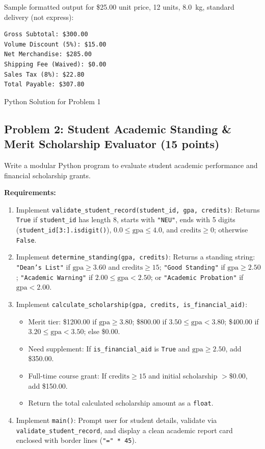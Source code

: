 \documentclass[11pt,a4paper]{article}
\begin{document}
Sample formatted output for \$25.00 unit price, 12 units, 8.0~kg, standard delivery (not express):
\begin{lstlisting}
Gross Subtotal: $300.00
Volume Discount (5%): $15.00
Net Merchandise: $285.00
Shipping Fee (Waived): $0.00
Sales Tax (8%): $22.80
Total Payable: $307.80
\end{lstlisting}

\begin{answerbox}[height=7.8cm]{Python Solution for Problem 1}
\end{answerbox}

\newpage


\subsection*{Problem 2: Student Academic Standing \& Merit Scholarship Evaluator (15 points)}
Write a modular Python program to evaluate student academic performance and financial scholarship grants.

\textbf{Requirements:}
\begin{enumerate}[leftmargin=1.8em,label=\arabic*.,itemsep=1.5pt]
  \item Implement \texttt{validate\_student\_record(student\_id, gpa, credits)}: Returns \texttt{True} if \texttt{student\_id} has length 8, starts with \texttt{"NEU"}, ends with 5 digits (\texttt{student\_id[3:].isdigit()}), $0.0 \le \text{gpa} \le 4.0$, and $\text{credits} \ge 0$; otherwise \texttt{False}.
  \item Implement \texttt{determine\_standing(gpa, credits)}: Returns a standing string:
    \texttt{"Dean's List"} if $\text{gpa} \ge 3.60$ and $\text{credits} \ge 15$;
    \texttt{"Good Standing"} if $\text{gpa} \ge 2.50$;
    \texttt{"Academic Warning"} if $2.00 \le \text{gpa} < 2.50$;
    or \texttt{"Academic Probation"} if $\text{gpa} < 2.00$.
  \item Implement \texttt{calculate\_scholarship(gpa, credits, is\_financial\_aid)}:
    \begin{itemize}[itemsep=0.5pt]
      \item Merit tier: \$1200.00 if $\text{gpa} \ge 3.80$; \$800.00 if $3.50 \le \text{gpa} < 3.80$; \$400.00 if $3.20 \le \text{gpa} < 3.50$; else \$0.00.
      \item Need supplement: If \texttt{is\_financial\_aid} is \texttt{True} and $\text{gpa} \ge 2.50$, add \$350.00.
      \item Full-time course grant: If $\text{credits} \ge 15$ and initial scholarship $> \$0.00$, add \$150.00.
      \item Return the total calculated scholarship amount as a \texttt{float}.
    \end{itemize}
  \item Implement \texttt{main()}: Prompt user for student details, validate via \texttt{validate\_student\_record}, and display a clean academic report card enclosed with border lines (\texttt{"=" * 45}).
\end{enumerate}
\end{document}
